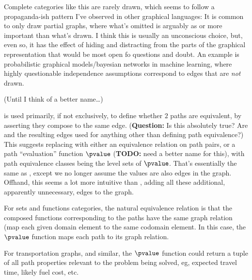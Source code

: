 \documentclass[11pt]{book}
\begin{document}
Complete categories like this are rarely drawn,
which seems to follow a propaganda-ish pattern 
I've observed in other graphical languages:
It is common to only draw partial graphs,
where what's omitted is arguably as or more important 
than what's drawn.
I think this is usually an unconscious choice,
but, even so, it has the effect of hiding and distracting 
from the parts of the graphical representation that would
be most open fo questions and doubt.
An example is probabilistic graphical models/bayesian networks
in machine learning, where highly questionable
independence assumptions correspond to edges that 
are \textsl{not} drawn.

\label{sec:Kategory_from_digraph}

(Until I think of a better name\ldots)

\compose is used primarily, if not exclusively,
to define whether $2$ paths are equivalent, by asserting they 
compose to the same edge.
(\textbf{Question:} Is this absolutely true?
Are \compose and the resulting edges
used for anything other than defining path equivalence?)
This suggests replacing \compose with 
either an equivalence relation on path pairs,
or a path ``evaluation'' function $\pvalue$
(\textbf{TODO:} need a better name for this),
with path equivalence classes
being the level sets of $\pvalue$.
That's essentially the same as \compose,
except we no longer assume the values are also edges in the graph.
Offhand, this seems a lot more intuitive than \compose,
adding all these additional, apparently unnecessary, edges to
the graph.

For sets and functions categories, the natural equivalence relation
is that the composed functions corresponding to the paths 
have the same graph relation (map each given domain element to the 
same codomain element. 
In this case, the $\pvalue$ function maps each path
to its graph relation.

For transportation graphs, and similar, the $\pvalue$ 
function could return a tuple of all path properties relevant to
the problem being solved, eg,  expected travel time, likely fuel 
cost, etc.
\end{document}
